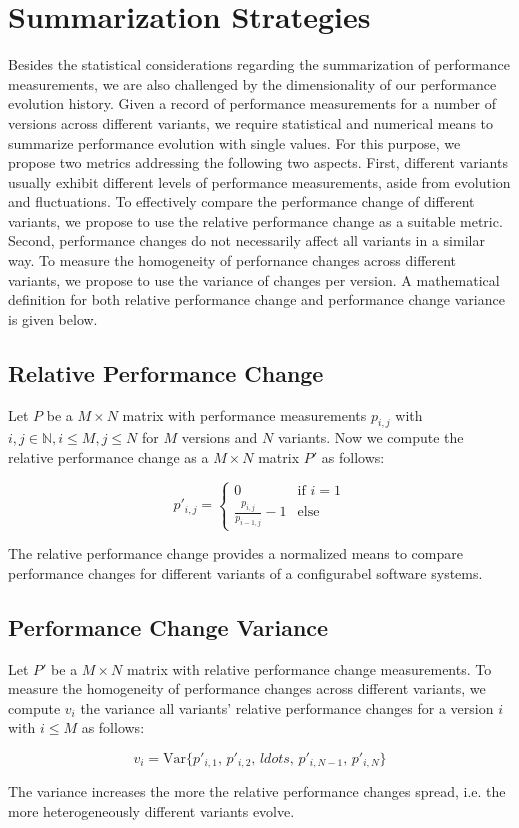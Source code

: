 \section{Summarization Strategies}
Besides the statistical considerations regarding the summarization of
performance measurements, we are also challenged by the dimensionality of our
performance evolution history. Given a record of performance measurements for a
number of versions across different variants, we require statistical and
numerical means to summarize performance evolution with single values. For this
purpose, we propose two metrics addressing the following two aspects. First,
different variants usually exhibit different levels of performance
measurements, aside from evolution and fluctuations. To effectively compare the
performance change of different variants, we propose to use the relative
performance change as a suitable metric. Second, performance changes do not
necessarily affect all variants in a similar way. To measure the homogeneity of
perfornance changes across different variants, we propose to use the variance
of changes per version. A mathematical definition for both relative performance
change and performance change variance is given below.

\subsection{Relative Performance Change}\label{sec:relativechange}
Let $P$ be a $M \times N$ matrix with performance measurements $p_{i, j}$ with
$i, j \in \mathbb{N}, i \leq M, j \leq N$ for $M$ versions and $N$ variants. Now
we compute the relative performance change as a $M \times N$ matrix $P'$ as
follows:

\begin{equation}
   p'_{i, j} =
   \begin{cases}
     0 & \text{if~} i = 1 \\
     \frac{p_{i, j}}{p_{i-1,j}} - 1 & \text{else} 
   \end{cases}
\end{equation}

The relative performance change provides a normalized means to compare
performance changes for different variants of a configurabel software systems.

\subsection{Performance Change Variance}\label{sec:changevar}
Let $P'$ be a $M \times N$ matrix with relative performance change measurements.
To measure the homogeneity of performance changes across different variants, we
compute $v_i$ the variance all variants' relative performance changes for a
version $i$ with $i \leq M$ as follows:

\begin{equation}
   v_i = \text{Var}\lbrace p'_{i,1},\,p'_{i,2},\,ldots,\,p'_{i,N-1},\,p'_{i,N}
   \rbrace
\end{equation}

The variance increases the more the relative performance changes spread, i.e.
the more heterogeneously different variants evolve.
